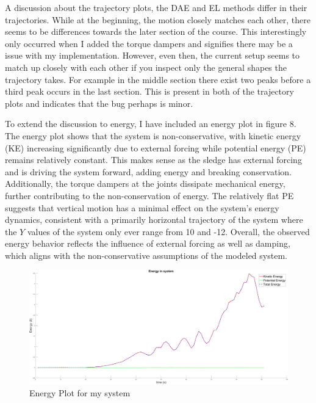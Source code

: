 \documentclass{article}
\begin{document}
A discussion about the trajectory plots, the DAE and EL methods differ in their trajectories. While at the beginning, the motion closely matches each other, there seems to be differences towards the later section of the course. This interestingly only occurred when I added the torque dampers and signifies there may be a issue with my implementation. However, even then, the current setup seems to match up closely with each other if you inspect only the general shapes the trajectory takes. For example in the middle section there exist two peaks before a third peak occurs in the last section. This is present in both of the trajectory plots and indicates that the bug perhaps is minor. 

To extend the discussion to energy, I have included an energy plot in figure 8. The energy plot shows that the system is non-conservative, with kinetic energy (KE) increasing significantly due to external forcing while potential energy (PE) remains relatively constant. This makes sense as the sledge has external forcing and is driving the system forward, adding energy and breaking conservation. Additionally, the torque dampers at the joints dissipate mechanical energy, further contributing to the non-conservation of energy. The relatively flat PE suggests that vertical motion has a minimal effect on the system’s energy dynamics, consistent with a primarily horizontal trajectory of the system where the $Y$ values of the system only ever range from 10 and -12. Overall, the observed energy behavior reflects the influence of external forcing as well as damping, which aligns with the non-conservative assumptions of the modeled system.
\begin{center}
	\begin{figure}[H]
		\includegraphics[width=15cm]{Energy_analysis}
		\caption{Energy Plot for my system}%
	\end{figure}
\end{center}
\end{document}
